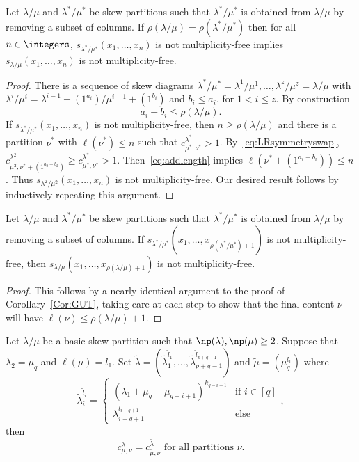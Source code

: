 \begin{coro}\label{Cor:GUT}
Let $\lambda/\mu$ and $\lambda^{*}/\mu^{*}$ be skew partitions such that $\lambda^{*}/\mu^{*}$ is obtained from $\lambda/\mu$ by removing a subset of columns. If $\rho(\lambda/\mu) = \rho(\lambda^{*}/\mu^{*})$ then for all $n\in \integers$, $s_{\lambda^{*}/\mu^{*}}(x_1,\ldots,x_n)$ is not multiplicity-free implies $s_{\lambda/\mu}(x_1,\ldots,x_n)$ is not multiplicity-free.
\end{coro}
\begin{proof} There is a sequence of skew diagrams $\lambda^{*}/\mu^{*}=\lambda^1/\mu^1,\ldots,\lambda^z/\mu^z=\lambda/\mu$ with $\lambda^i / \mu^i = \lambda^{i-1} + (1^{a_i}) / \mu^{i-1} + (1^{b_i})$ and $b_i \leq a_i$, for $1<i\leq z$. By construction
\begin{equation}
\label{eq:addlength}
a_i - b_i \leq \rho(\lambda/\mu).
\end{equation}
If $s_{\lambda^{*}/\mu^{*}}(x_1,\ldots,x_n)$ is not multiplicity-free, then $n \geq \rho(\lambda/\mu)$ and there is a partition $\nu^{*}$ with $\ell(\nu^{*}) \leq n$ such that $c^{\lambda^{*}}_{\mu^{*},\nu^{*}} > 1$. By~\eqref{eq:LRsymmetryswap}, $c^{\lambda^2}_{\mu^2,\nu^{*} + (1^{a_2 - b_2}) } \geq c^{\lambda^{*}}_{\mu^{*},\nu^{*}} > 1$. Then~\eqref{eq:addlength} implies $\ell(\nu^{*} + (1^{a_i - b_i})) \leq n$. Thus $s_{\lambda^2/\mu^2}(x_1,\ldots,x_n)$ is not multiplicity-free. Our desired result follows by inductively repeating this argument.
\end{proof}

\begin{coro}\label{Cor:GUT2}
Let $\lambda/\mu$ and $\lambda^{*}/\mu^{*}$ be skew partitions such that $\lambda^{*}/\mu^{*}$ is obtained from $\lambda/\mu$ by removing a subset of columns. If $s_{\lambda^{*}/\mu^{*}}(x_1,\ldots,x_{\rho(\lambda^{*}/\mu^{*}) + 1})$ is not multiplicity-free, then $s_{\lambda/\mu}(x_1,\ldots,x_{\rho(\lambda/\mu)+1})$ is not multiplicity-free.
\end{coro}
\begin{proof}
This follows by a nearly identical argument to the proof of Corollary~\ref{Cor:GUT}, taking care at each step to show that the final content $\nu$ will have $\ell(\nu) \leq \rho(\lambda/\mu) + 1$.
\end{proof}

\begin{lemma}\label{Lemma:switchingcol}
 Let $\lambda/\mu$ be a basic skew partition such that ${\np }(\lambda),{\np }(\mu)\geq 2$. Suppose that $\lambda_2 = \mu_q$ and $\ell(\mu) = l_1$. Set $\tilde\lambda = (\tilde\lambda_1^{\tilde l_1}, \ldots, \tilde\lambda_{p+q-1}^{\tilde l_{p+q-1}})$ and $\tilde\mu = (\mu_q^{l_1})$ where 
 \[
\tilde\lambda_i^{\tilde l_i} = 
 \begin{cases}
 (\lambda_1+\mu_q-\mu_{q-i+1})^{k_{q-i+1}} & \text{if }i\in [q]\\
 \lambda_{i-q+1}^{l_{i-q+1}} & \text{else}
 \end{cases},
\] 
then
 \[
c^{\lambda}_{\mu,\nu} = c^{\tilde\lambda}_{\tilde\mu,\nu} \text{ for all partitions $\nu$}.
\]
 
\end{lemma}

